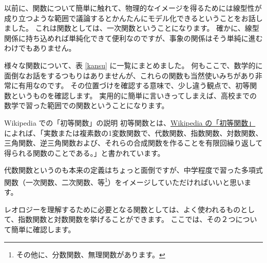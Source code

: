 \documentclass[uplatex,dvipdfmx,a4paper,11pt]{jsarticle}
\begin{document}
以前に、関数について簡単に触れて、物理的なイメージを得るためには線型性が成り立つような範囲で議論するとかんたんにモデル化できるということをお話しました。
これは関数としては、一次関数ということになります。
確かに、線型関係に持ち込めれば単純化できて便利なのですが、事象の関係はそう単純に進むわけでもありません。

様々な関数について、表 \ref{kansu} に一覧にまとめました。
何もここで、数学的に面倒なお話をするつもりはありませんが、これらの関数も当然使いみちがあり非常に有用なのです。
その位置づけを確認する意味で、少し違う観点で、初等関数というものを確認します。
実用的に簡単に言いきってしまえば、高校までの数学で習った範囲での関数ということになります。

\begin{itembox}[l]{Wikipedia での「初等関数」の説明}
	初等関数とは、\href{https://ja.wikipedia.org/wiki/%E5%88%9D%E7%AD%89%E9%96%A2%E6%95%B0#:~:text=%E5%88%9D%E7%AD%89%E9%96%A2%E6%95%B0%EF%BC%88%E3%81%97%E3%82%87%E3%81%A8%E3%81%86%E3%81%8B%E3%82%93%E3%81%99%E3%81%86,%E3%81%AA%E3%81%A9%E3%81%AF%E5%88%9D%E7%AD%89%E9%96%A2%E6%95%B0%E3%81%A7%E3%81%AA%E3%81%84%E3%80%82}{Wikipedia の「初等関数」} によれば、「実数または複素数の1変数関数で、代数関数、指数関数、対数関数、三角関数、逆三角関数および、それらの合成関数を作ることを有限回繰り返して得られる関数のことである。」と書かれています。

\end{itembox}

代数関数というのも本来の定義はちょっと面倒ですが、中学程度で習った多項式関数（一次関数、二次関数、等\footnote{
	その他に、分数関数、無理関数があります。
}）をイメージしていただければいいと思います。

レオロジーを理解するために必要となる関数としては、よく使われるものとして、指数関数と対数関数を挙げることができます。
ここでは、その２つについて簡単に確認します。
\end{document}
